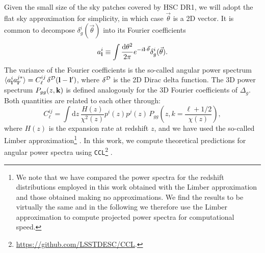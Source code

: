\documentclass[a4paper,11pt]{article}
\newcommand{\nv}{\vec{\theta}}
\begin{document}
    Given the small size of the sky patches covered by HSC DR1, we will adopt the flat sky approximation for simplicity, in which case $\nv$ is a 2D vector. It is common to decompose $\delta^i_g(\nv)$ into its Fourier coefficients
    \begin{equation}
      a^i_{\bf l}\equiv \int\frac{\mathrm{d}\theta^2}{2\pi}e^{-i{\bf l}\cdot\nv}\delta^i_g(\nv).
    \end{equation}
    The variance of the Fourier coefficients is the so-called angular power spectrum $\langle a^i_{\bf l}a^{j*}_{{\bf l}'}\rangle = C^{ij}_\ell\,\delta^{\cal D}({\bf l}-{\bf l}')$, where $\delta^{\cal D}$ is the 2D Dirac delta function. The 3D power spectrum $P_{gg}(z,{\bf k})$ is defined analogously for the 3D Fourier coefficients of $\Delta_g$. Both quantities are related to each other through:
    \begin{equation}\label{eq:cell_gg_limber}
      C^{ij}_\ell = \int \mathrm{d}z\,\frac{H(z)}{\chi^2(z)} p^i(z)p^j(z)\,P_{gg}\left(z,k=\frac{\ell+1/2}{\chi(z)}\right),
    \end{equation}
    where $H(z)$ is the expansion rate at redshift $z$, and we have used the so-called Limber approximation\footnote{We note that we have compared the power spectra for the redshift distributions employed in this work obtained with the Limber approximation and those obtained making no approximations. We find the results to be virtually the same and in the following we therefore use the Limber approximation to compute projected power spectra for computational speed.} \citep{Limber:1953, Kaiser:1992, Kaiser:1998}. In this work, we compute theoretical predictions for angular power spectra using \texttt{CCL}\footnote{\url{https://github.com/LSSTDESC/CCL}.} \cite{Chisari:2019}.
\end{document}
